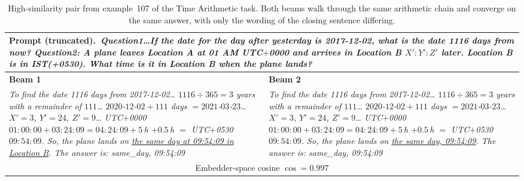\begin{table}[h]
\caption{High-similarity pair from example~107 of the Time Arithmetic task. Both beams
walk through the same arithmetic chain and converge on the same answer,
with only the wording of the closing sentence differing.}
\label{tab:beam_sim_high}
\small
\centering
\begin{tabular}{p{} p{}}
\toprule
\multicolumn{2}{p{0.96\textwidth}}{\textbf{Prompt (truncated).}\
\textit{Question1\ldots If the date for the day after yesterday is
2017-12-02, what is the date 1116 days from now? Question2: A plane
leaves Location A at 01 AM UTC$+$0000 and arrives in Location B
$X'{:}Y'{:}Z'$ later. Location B is in IST(+0530). What time is it in
Location B when the plane lands?}} \\
\midrule
\textbf{Beam 1} & \textbf{Beam 2} \\
\midrule
\textit{To find the date 1116 days from 2017-12-02\ldots
$1116 \div 365 = 3$ years with a remainder of $111$\ldots
$2020$-$12$-$02 + 111$ days $= 2021$-$03$-$23$\ldots
$X' = 3$, $Y' = 24$, $Z' = 9$\ldots
UTC$+$0000\ $01{:}00{:}00 + 03{:}24{:}09 = 04{:}24{:}09 + 5\,$h
$+ 0.5\,$h $=$ UTC$+$0530\ $09{:}54{:}09$.
So, the plane lands on \underline{the same day at 09:54:09 in Location B}.
The answer is: same\_day, 09:54:09}
&
\textit{To find the date 1116 days from 2017-12-02\ldots
$1116 \div 365 = 3$ years with a remainder of $111$\ldots
$2020$-$12$-$02 + 111$ days $= 2021$-$03$-$23$\ldots
$X' = 3$, $Y' = 24$, $Z' = 9$\ldots
UTC$+$0000\ $01{:}00{:}00 + 03{:}24{:}09 = 04{:}24{:}09 + 5\,$h
$+ 0.5\,$h $=$ UTC$+$0530\ $09{:}54{:}09$.
So, the plane lands on \underline{the same day, 09:54:09}.
The answer is: same\_day, 09:54:09}
\\
\midrule
\multicolumn{2}{c}{Embedder-space cosine $\cos = 0.997$} \\
\bottomrule
\end{tabular}
\end{table}

